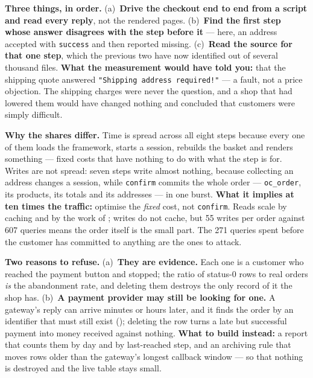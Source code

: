 \begin{ans}
  \item \textbf{Three things, in order.} (a)~\textbf{Drive the checkout
        end to end from a script and read every reply}, not the rendered
        pages. (b)~\textbf{Find the first step whose answer disagrees with the
        step before it} --- here, an address accepted with
        \texttt{success} and then reported missing. (c)~\textbf{Read the
        source for that one step}, which the previous two have now identified
        out of several thousand files. \textbf{What the measurement would have
        told you:} that the shipping quote answered
        \texttt{"Shipping address required!"} --- a fault, not a price
        objection. The shipping charges were never the question, and a shop
        that had lowered them would have changed nothing and concluded that
        customers were simply difficult.
  \item \textbf{Why the shares differ.} Time is spread across all eight
        steps because every one of them loads the framework, starts a session,
        rebuilds the basket and renders something --- fixed costs that have
        nothing to do with what the step is for. Writes are not spread: seven
        steps write almost nothing, because collecting an address changes a
        session, while \texttt{confirm} commits the whole order ---
        \texttt{oc\_order}, its products, its totals and its addresses --- in
        one burst. \textbf{What it implies at ten times the traffic:} optimise
        the \emph{fixed} cost, not \texttt{confirm}. Reads scale by caching
        and by the work of ; writes do not cache, but 55
        writes per order against 607 queries means the order itself is the
        small part. The 271 queries spent before the customer has committed to
        anything are the ones to attack.
  \item \textbf{Two reasons to refuse.} (a)~\textbf{They are evidence.}
        Each one is a customer who reached the payment button and stopped; the
        ratio of status-0 rows to real orders \emph{is} the abandonment rate,
        and deleting them destroys the only record of it the shop has.
        (b)~\textbf{A payment provider may still be looking for one.} A
        gateway's reply can arrive minutes or hours later, and it finds the
        order by an identifier that must still exist ();
        deleting the row turns a late but successful payment into money
        received against nothing. \textbf{What to build instead:} a report
        that counts them by day and by last-reached step, and an archiving rule
        that moves rows older than the gateway's longest callback window --- so
        that nothing is destroyed and the live table stays small.
\end{ans}

